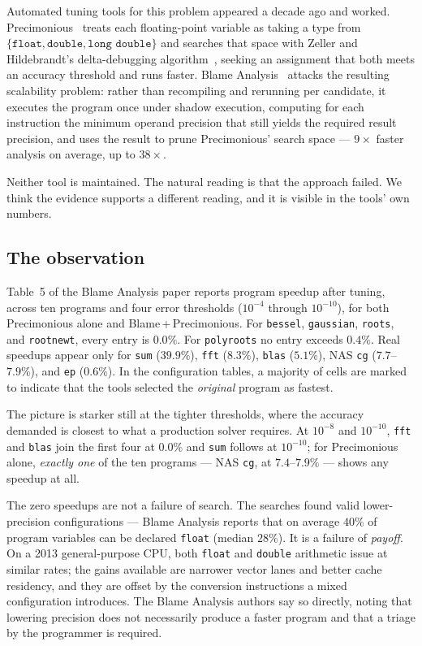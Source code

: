 \documentclass[11pt]{article}
\begin{document}
Automated tuning tools for this problem appeared a decade ago and worked.
Precimonious~\cite{precimonious} treats each floating-point variable as taking a
type from $\{\texttt{float}, \texttt{double}, \texttt{long double}\}$ and searches
that space with Zeller and Hildebrandt's delta-debugging
algorithm~\cite{ddmin}, seeking an assignment that both meets an accuracy
threshold and runs faster. Blame Analysis~\cite{blame} attacks the resulting
scalability problem: rather than recompiling and rerunning per candidate, it
executes the program once under shadow execution, computing for each instruction
the minimum operand precision that still yields the required result precision,
and uses the result to prune Precimonious' search space --- $9\times$ faster
analysis on average, up to $38\times$.

Neither tool is maintained. The natural reading is that the approach failed. We
think the evidence supports a different reading, and it is visible in the
tools' own numbers.

\subsection{The observation}

Table~5 of the Blame Analysis paper reports program speedup after tuning, across
ten programs and four error thresholds ($10^{-4}$ through $10^{-10}$), for both
Precimonious alone and Blame\,+\,Precimonious. For \texttt{bessel},
\texttt{gaussian}, \texttt{roots}, and \texttt{rootnewt}, every entry is
$0.0\%$. For \texttt{polyroots} no entry exceeds $0.4\%$. Real speedups appear
only for \texttt{sum} ($39.9\%$), \texttt{fft} ($8.3\%$), \texttt{blas}
($5.1\%$), NAS \texttt{cg} ($7.7$--$7.9\%$), and \texttt{ep} ($0.6\%$). In the
configuration tables, a majority of cells are marked to indicate that the tools
selected the \emph{original} program as fastest.

The picture is starker still at the tighter thresholds, where the accuracy
demanded is closest to what a production solver requires. At $10^{-8}$ and
$10^{-10}$, \texttt{fft} and \texttt{blas} join the first four at $0.0\%$ and
\texttt{sum} follows at $10^{-10}$; for Precimonious alone, \emph{exactly one} of
the ten programs --- NAS \texttt{cg}, at $7.4$--$7.9\%$ --- shows any speedup at
all.

The zero speedups are not a failure of search. The searches found valid
lower-precision
configurations --- Blame Analysis reports that on average $40\%$ of program
variables can be declared \texttt{float} (median $28\%$). It is a failure of
\emph{payoff}. On a 2013 general-purpose CPU, both \texttt{float} and
\texttt{double} arithmetic issue at similar rates; the gains available are
narrower vector lanes and better cache residency, and they are offset by the
conversion instructions a mixed configuration introduces. The Blame Analysis
authors say so directly, noting that lowering precision does not necessarily
produce a faster program and that a triage by the programmer is required.
\end{document}

